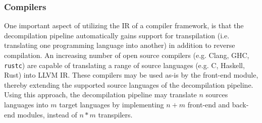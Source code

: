 
\subsubsection{Compilers}


One important aspect of utilizing the IR of a compiler framework, is that the decompilation pipeline automatically gains support for transpilation (i.e. translating one programming language into another) in addition to reverse compilation. An increasing number of open source compilers (e.g. Clang, GHC, \texttt{rustc}) are capable of translating a range of source languages (e.g. C, Haskell, Rust) into LLVM IR. These compilers may be used as-is by the front-end module, thereby extending the supported source languages of the decompilation pipeline. Using this approach, the decompilation pipeline may translate $ n $ sources languages into $ m $ target languages by implementing $ n + m $ front-end and back-end modules, instead of $ n * m $ transpilers.
